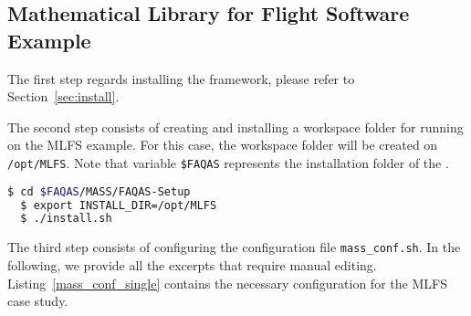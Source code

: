 
\subsection{Mathematical Library for Flight Software Example}
\label{sec:single_machine}

The first step regards installing the \MASS framework, please refer to Section~\ref{sec:install}.

The second step consists of creating and installing a workspace folder for running \MASS on the MLFS example. For this case, the workspace folder will be created on \texttt{/opt/MLFS}. Note that variable \texttt{\$FAQAS} represents the installation folder of the \FAQAS.

\begin{lstlisting}[language=bash]
  $ cd $FAQAS/MASS/FAQAS-Setup
  $ export INSTALL_DIR=/opt/MLFS
  $ ./install.sh
\end{lstlisting}

The third step consists of configuring the \MASS configuration file \texttt{mass\_conf.sh}. In the following, we provide all the excerpts that require manual editing. Listing~\ref{mass_conf_single} contains the necessary configuration for the MLFS case study.

